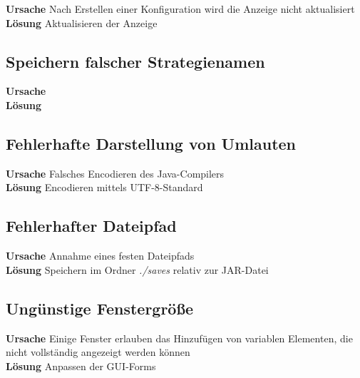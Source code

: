 \textbf{Ursache} Nach Erstellen einer Konfiguration wird die Anzeige nicht aktualisiert\\
\textbf{Lösung} Aktualisieren der Anzeige

\subsection{Speichern falscher Strategienamen}

\textbf{Ursache}\\
\textbf{Lösung}

\subsection{Fehlerhafte Darstellung von Umlauten}

\textbf{Ursache} Falsches Encodieren des Java-Compilers\\
\textbf{Lösung} Encodieren mittels UTF-8-Standard

\subsection{Fehlerhafter Dateipfad}

\textbf{Ursache} Annahme eines festen Dateipfads\\
\textbf{Lösung} Speichern im Ordner \emph{./saves} relativ zur JAR-Datei

\subsection{Ungünstige Fenstergröße}

\textbf{Ursache} Einige Fenster erlauben das Hinzufügen von variablen Elementen, die nicht vollständig angezeigt werden können\\
\textbf{Lösung} Anpassen der GUI-Forms

